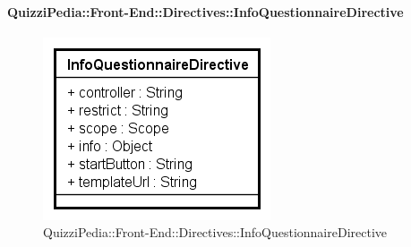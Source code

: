 	\paragraph{QuizziPedia::Front-End::Directives::InfoQuestionnaireDirective}
		
		\label{QuizziPedia::Front-End::Directives::InfoQuestionnaireDirective}
		
		\begin{figure}[ht]
			\centering
			\includegraphics[scale=0.80,keepaspectratio]{UML/Classi/Front-End/QuizziPedia_Front-end_Templates_InfoQuestionnaireTemplate.png}
			\caption{QuizziPedia::Front-End::Directives::InfoQuestionnaireDirective}
		\end{figure} \FloatBarrier
		
